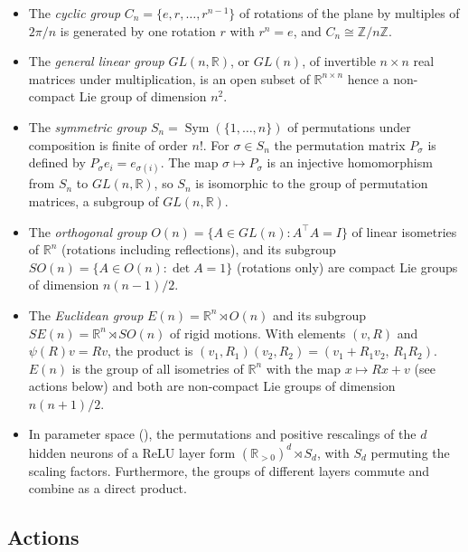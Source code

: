 \documentclass[mathematics,review,submit,moreauthors]{Definitions/mdpi}
\begin{document}
\begin{Example}\label{ex:groups}
    \phantom{u}
    \begin{itemize}
        \item The \emph{cyclic group} $C_n=\{e,r,\dots,r^{n-1}\}$ of rotations of the plane by multiples of $2\pi/n$ is generated by one rotation $r$ with $r^n=e$, and $C_n\cong\mathbb{Z}/n\mathbb{Z}$.
        \item The \emph{general linear group} $GL(n,\mathbb{R})$, or $GL(n)$, of invertible $n\times n$ real matrices under multiplication, is an open subset of $\mathbb{R}^{n\times n}$ hence a non-compact Lie group of dimension $n^2$.
        \item The \emph{symmetric group} $S_n=\operatorname{Sym}(\{1,\dots,n\})$ of permutations under composition is finite of order $n!$. For $\sigma \in S_n$ the permutation matrix $P_\sigma$ is defined by $P_\sigma e_i=e_{\sigma(i)}$.
        The map $\sigma\mapsto P_\sigma$ is an injective homomorphism from $S_n$ to $GL(n,\mathbb{R})$, so $S_n$ is isomorphic to the group of permutation matrices, a subgroup of $GL(n,\mathbb{R})$.
        \item The \emph{orthogonal group} $O(n)=\{A\in GL(n):A^\top A=I\}$ of linear isometries of $\mathbb{R}^n$ (rotations including reflections), and its subgroup $SO(n)=\{A\in O(n):\det A=1\}$ (rotations only) are compact Lie groups of dimension $n(n-1)/2$.
        \item The \emph{Euclidean group} $E(n)=\mathbb{R}^n\rtimes O(n)$ and its subgroup $SE(n)=\mathbb{R}^n\rtimes SO(n)$ of rigid motions. With elements $(v,R)$ and $\psi(R)v=Rv$, the product is $(v_1,R_1)(v_2,R_2)=(v_1+R_1v_2,\,R_1R_2)$. $E(n)$ is the group of all isometries of $\mathbb{R}^n$ with the map $x\mapsto Rx+v$ (see actions below) and both are non-compact Lie groups of dimension $n(n+1)/2$.
        \item In parameter space (), the permutations and positive rescalings of the $d$ hidden neurons of a ReLU layer form $(\mathbb{R}_{>0})^{d}\rtimes S_{d}$, with $S_d$ permuting the scaling factors.
        Furthermore, the groups of different layers commute and combine as a direct product.
    \end{itemize}
\end{Example}

\subsection{Actions}\label{sec:actions}
\end{document}
